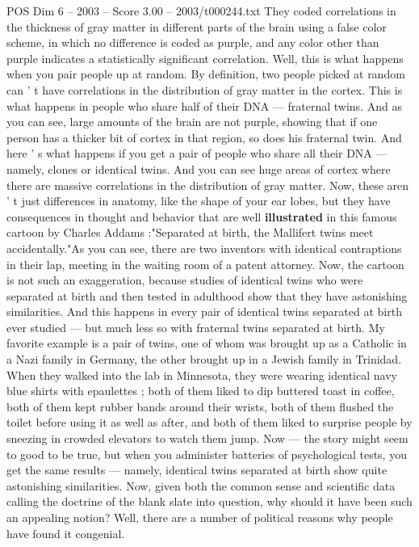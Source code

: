 \begin{textsample}{POS Dim 6 – 2003 – Score 3.00 – 2003/t000244.txt}
They coded correlations in the thickness of gray matter in different parts of the brain using a false color scheme, in which no difference is coded as purple, and any color other than purple indicates a statistically significant correlation.
Well, this is what happens when you pair people up at random.
By definition, two people picked at random can ' t have correlations in the distribution of gray matter in the cortex.
This is what happens in people who share half of their DNA — fraternal twins.
And as you can see, large amounts of the brain are not purple, showing that if one person has a thicker bit of cortex in that region, so does his fraternal twin.
And here ' s what happens if you get a pair of people who share all their DNA — namely, clones or identical twins.
And you can see huge areas of cortex where there are massive correlations in the distribution of gray matter.
Now, these aren ' t just differences in anatomy, like the shape of your ear lobes, but they have consequences in thought and behavior that are well \textbf{illustrated} in this famous cartoon by Charles Addams :"Separated at birth, the Mallifert twins meet accidentally."As you can see, there are two inventors with identical contraptions in their lap, meeting in the waiting room of a patent attorney.
Now, the cartoon is not such an exaggeration, because studies of identical twins who were separated at birth and then tested in adulthood show that they have astonishing similarities.
And this happens in every pair of identical twins separated at birth ever studied — but much less so with fraternal twins separated at birth.
My favorite example is a pair of twins, one of whom was brought up as a Catholic in a Nazi family in Germany, the other brought up in a Jewish family in Trinidad.
When they walked into the lab in Minnesota, they were wearing identical navy blue shirts with epaulettes ; both of them liked to dip buttered toast in coffee, both of them kept rubber bands around their wrists, both of them flushed the toilet before using it as well as after, and both of them liked to surprise people by sneezing in crowded elevators to watch them jump.
Now — the story might seem to good to be true, but when you administer batteries of psychological tests, you get the same results — namely, identical twins separated at birth show quite astonishing similarities.
Now, given both the common sense and scientific data calling the doctrine of the blank slate into question, why should it have been such an appealing notion?
Well, there are a number of political reasons why people have found it congenial.

\end{textsample}
